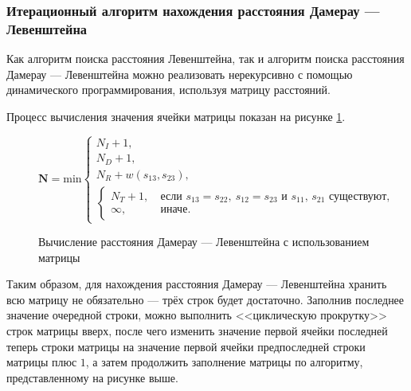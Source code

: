 \subsubsection{Итерационный алгоритм нахождения расстояния Дамерау --- Левенштейна}

Как алгоритм поиска расстояния Левенштейна, так и алгоритм поиска расстояния Дамерау --- Левенштейна можно реализовать нерекурсивно с помощью динамического программирования, используя матрицу расстояний.

Процесс вычисления значения ячейки матрицы показан на рисунке \ref{fig:dlmat}.

\begin{figure}[H]
    \begin{center}

        \( \boldsymbol{N} =
        \mathrm{min} \begin{cases}
    N_I + 1, \\
    N_D + 1, \\
    N_R + w(s_{13}, s_{23}), \\
            \begin{cases}
                N_T + 1,\ &\text{если $s_{13} = s_{22},\ s_{12} = s_{23}$ и $s_{11}$, $s_{21}$ существуют}, \\
                \infty,\ &\text{иначе}.
            \end{cases}
\end{cases} \)
    \end{center}
    \caption{Вычисление расстояния Дамерау --- Левенштейна с использованием матрицы}
    \label{fig:dlmat}
\end{figure}

Таким образом, для нахождения расстояния Дамерау --- Левенштейна хранить всю матрицу не обязательно --- трёх строк будет достаточно.
Заполнив последнее значение очередной строки, можно выполнить <<циклическую прокрутку>> строк матрицы вверх, после чего изменить значение первой ячейки последней теперь строки матрицы на значение первой ячейки предпоследней строки матрицы плюс $1$, а затем продолжить заполнение матрицы по алгоритму, представленному на рисунке выше.
